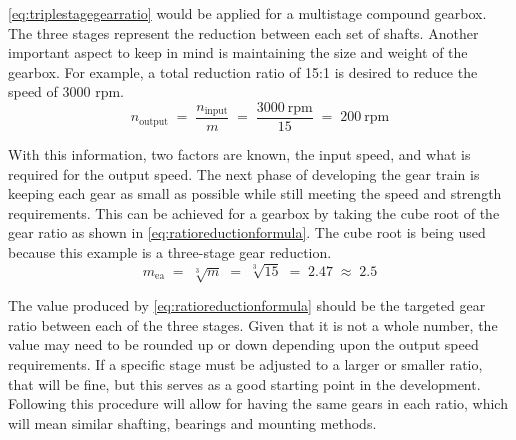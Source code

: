         \autoref{eq:triplestagegearratio} would be applied for a multistage compound gearbox. The three stages represent 
        the reduction between each set of shafts. Another important aspect to keep in mind is maintaining the size 
        and weight of the gearbox. For example, a total reduction ratio of 15:1 is desired to reduce the speed of 3000 rpm.
            \begin{equation}
                \label{eq:speedreduction}
                n_{\text{output}}
                \;=\;
                \frac{n_{\text{input}}}{m}
                \;=\;
                \frac{3000~\text{rpm}}{15}
                \;=\;
                200~\text{rpm}
            \end{equation}
        
        With this information, two factors are known, the input speed, and what is required for the output speed. 
        The next phase of developing the gear train is keeping each gear as small as possible while still meeting 
        the speed and strength requirements. This can be achieved for a gearbox by taking the cube root of the 
        gear ratio as shown in \autoref{eq:ratioreductionformula}. The cube root is being used because this example 
        is a three-stage gear reduction. 
            \begin{equation}
                \label{eq:ratioreductionformula}
                m_{\text{ea}}
                \;=\;
                \sqrt[3]{m}
                \;=\;
                \sqrt[3]{15}
                \;=\;
                2.47
                \;\approx\;
                2.5
            \end{equation}

        The value produced by \autoref{eq:ratioreductionformula} should be the targeted gear ratio between each of the three stages. 
        Given that it is not a whole number, the value may need to be rounded up or down depending upon the 
        output speed requirements. If a specific stage must be adjusted to a larger or smaller ratio, 
        that will be fine, but this serves as a good starting point in the development. Following this 
        procedure will allow for having the same gears in each ratio, which will mean similar shafting, 
        bearings and mounting methods.  

